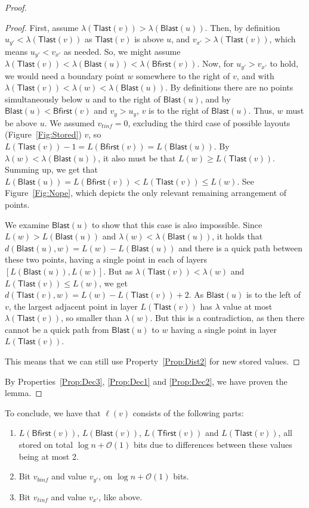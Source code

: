 \documentclass[a4paper,11pt]{article}
\newcommand{\Oh}{\mathcal{O}}
\newcommand{\lam}{\lambda}
\newcommand{\Blast}{\mathsf{Blast}}
\newcommand{\Bfirst}{\mathsf{Bfirst}}
\newcommand{\Tlast}{\mathsf{Tlast}}
\newcommand{\Tfirst}{\mathsf{Tfirst}}
\begin{document}
\begin{proof}
\begin{proof}
First, assume $\lam(\Tlast(v))>\lam(\Blast(u))$.
Then, by definition $u_{y'}<\lam(\Tlast(v))$ as $\Tlast(v)$ is above $u$, and $v_{x'}>\lam(\Tlast(v))$,
which means $u_{y'}<v_{x'}$ as needed.
So, we might assume $\lam(\Tlast(v))<\lam(\Blast(u))<\lam(\Bfirst(v))$.
Now, for $u_{y'}>v_{x'}$ to hold, we would need a boundary point $w$ somewhere to the right of $v$,
and with $\lam(\Tlast(v))<\lam(w)<\lam(\Blast(u))$.
By definitions there are no points simultaneously below $u$ and to the right of $\Blast(u)$,
and by $\Blast(u)<\Bfirst(v)$ and $v_y > u_y$, $v$ is to the right of $\Blast(u)$.
Thus, $w$ must be above $u$.
We assumed $v_{tinf}=0$, excluding the third case of possible layouts (Figure~\ref{Fig:Stored}) $v$,
so $L(\Tlast(v))-1=L(\Bfirst(v))=L(\Blast(u))$.
By $\lam(w)<\lam(\Blast(u))$, it also must be that $L(w) \geq L(\Tlast(v))$.
Summing up, we get that $L(\Blast(u))=L(\Bfirst(v))<L(\Tlast(v)) \leq L(w)$.
See Figure~\ref{Fig:Nope}, which depicts the only relevant remaining arrangement of points.

We examine $\Blast(u)$ to show that this case is also impossible.
Since $L(w)>L(\Blast(u))$ and $\lam(w)<\lam(\Blast(u))$, it holds that $d(\Blast(u),w)=L(w)-L(\Blast(u))$
and there is a quick path between these two points, having a single point in each of layers $[L(\Blast(u)),L(w)]$.
But as $\lam(\Tlast(v))<\lam(w)$ and $L(\Tlast(v)) \leq L(w)$, we get $d(\Tlast(v),w)=L(w)-L(\Tlast(v))+2$.
As $\Blast(u)$ is to the left of $v$, the largest adjacent point in layer $L(\Tlast(v))$ has $\lam$ value at most
$\lam(\Tlast(v))$, so smaller than $\lam(w)$.
But this is a contradiction, as then there cannot be a quick path from $\Blast(u)$ to $w$
having a single point in layer $L(\Tlast(v))$.

This means that we can still use Property~\ref{Prop:Dist2} for new stored values.
\end{proof}

By Properties~\ref{Prop:Dec3}, \ref{Prop:Dec1} and \ref{Prop:Dec2}, we have proven the lemma.
\end{proof}

To conclude, we have that $\ell(v)$ consists of the following parts:
\begin{enumerate}
\item $L(\Bfirst(v))$, $L(\Blast(v))$, $L(\Tfirst(v))$ and $L(\Tlast(v))$, all stored on total $\log{n}+\Oh(1)$ bits
due to differences between these values being at most 2.
\item Bit $v_{binf}$ and value $v_{y'}$, on $\log{n}+\Oh(1)$ bits.
\item Bit $v_{tinf}$ and value $v_{x'}$, like above.
\end{enumerate}
\end{document}
